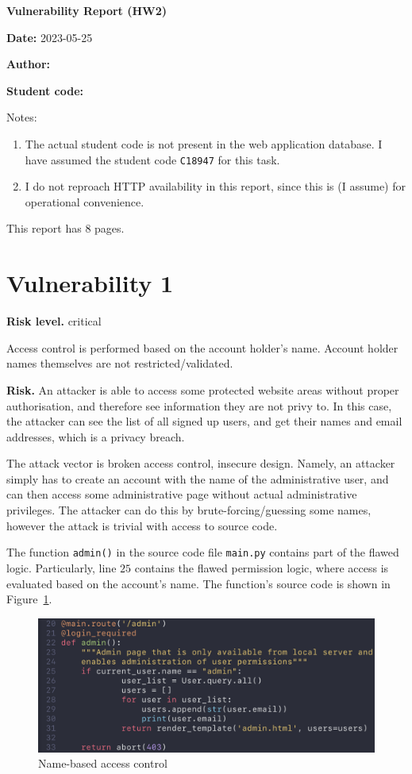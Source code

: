 \documentclass[parskip=half]{scrartcl}
\newcommand{\figref}[1]{Figure~\ref{#1}}
\begin{document}
{\LARGE \textbf{\textsf{Vulnerability Report (HW2)}}}
\vspace*{1em}

\textbf{Date:} 2023-05-25

\textbf{Author:} \docauthor

\textbf{Student code:} \texttt{\studentcode}

Notes:
\begin{enumerate}
    \item The actual student code is not present in the web application
    database. I have assumed the student code \texttt{C18947} for this task.
    \item I do not reproach HTTP availability in this report, since this is
    (I assume) for operational convenience.
\end{enumerate}

This report has $8$ pages.

\section*{Vulnerability 1}\label{vuln1}

\textbf{Risk level.} critical

Access control is performed based on the account holder's name. Account holder
names themselves are not restricted/validated.

\textbf{Risk.} An attacker is able to access some protected website areas
without proper authorisation, and therefore see information they are not privy
to. In this case, the attacker can see the list of all signed up users, and
get their names and email addresses, which is a privacy breach.

The attack vector is broken access control, insecure design. Namely, an
attacker simply has to create an account with the name of the administrative
user, and can then access some administrative page without actual
administrative privileges. The attacker can do this by brute-forcing/guessing
some names, however the attack is trivial with access to source code.

The function \texttt{admin()} in the source code file \texttt{main.py} contains
part of the flawed logic. Particularly, line $25$ contains the flawed
permission logic, where access is evaluated based on the account's name.
The function's source code is shown in \figref{fig:code:admincomp}.

\begin{figure}[h]
    \centering
    \includegraphics[width=\textwidth]{code_admincomp}
    \caption{Name-based access control}
    \label{fig:code:admincomp}
\end{figure}
\end{document}
